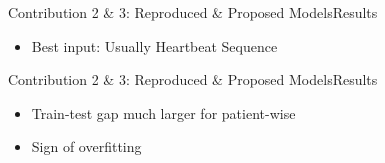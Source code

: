 \begin{frame}{Contribution 2 \& 3: Reproduced \& Proposed Models}{Results}
    \begin{figure}[htbp]
        \centering
        
        

        
        
    \end{figure}
    \begin{itemize}
        \item Best input: Usually Heartbeat Sequence
    \end{itemize}
\end{frame}

\begin{frame}{Contribution 2 \& 3: Reproduced \& Proposed Models}{Results}
    \begin{table}[htbp]
        \centering
    \end{table}
    \begin{itemize}
        \item Train-test gap much larger for patient-wise
        \item Sign of overfitting
    \end{itemize}
\end{frame}

